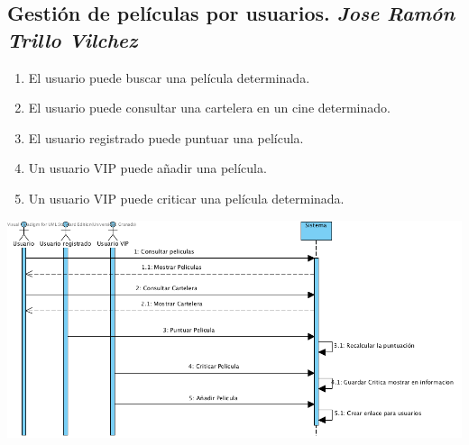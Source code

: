 \documentclass{article}
\begin{document}
	\subsection*{Gestión de películas por usuarios. \textit{Jose Ramón Trillo Vilchez}}
	\begin{enumerate}
		\item El usuario puede buscar una película determinada.
    		\item El usuario puede consultar una cartelera en un cine determinado.
    		\item El usuario registrado puede puntuar una película.
    		\item Un usuario VIP puede añadir una película.
    		\item Un usuario VIP puede criticar una película determinada.
	\end{enumerate}
	\includegraphics[width=1\linewidth]{./S-Peliculasusuarios}
		
\end{document}
